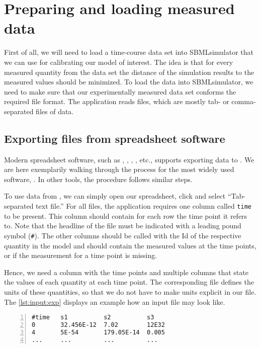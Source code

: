 \section{Preparing and loading measured data}
\label{ch:prepare}

First of all, we will need to load a time-course data set into SBMLsimulator that we can use for calibrating our model of interest.
The idea is that for every measured quantity from the data set the distance of the simulation results to the measured values should be minimized.
To load the data into SBMLsimulator, we need to make sure that our experimentally measured data set conforms the required file format.
The application reads \CSV files, which are mostly tab- or comma-separated files of data.

\subsection{Exporting \CSV files from spreadsheet software}
\label{sec:CSVformat}

Modern spreadsheet software, such as \Excel, \GoogleTables, \LibreCalc, \AppleNumbers, etc., supports exporting data to \CSV.
We are here exemplarily walking through the process for the most widely used software, \Excel.
In other tools, the procedure follows similar steps.

To use data from \Excel, we can simply open our \Excel spreadsheet, click  and select ``Tab-separated text file.''
For all files, the application requires one column called \texttt{time} to be present.
This column should contain for each row the time point it refers to.
Note that the headline of the file must be indicated with a leading pound symbol (\texttt{\#}).
The other columns should be called with the \ac{Id} of the respective quantity in the model and should contain the measured values at the time points, or \NaN if the measurement for a time point is missing. 

Hence, we need a column with the time points and multiple columns that state the values
of each quantity at each time point.
The corresponding \SBML file defines the units of these quantities, so that we do not have to make units explicit in our \CSV file.
The \cref{lst:input:exp} displays an example how an input file may look like.
\begin{lstlisting}[caption={Input file example for experimental data},label={lst:input:exp},numbers=left,captionpos=t,float=t]
#time   s1          s2          s3
0       32.456E-12  7.02        12E32
4       5E-54       179.05E-14  0.005
...     ...         ...         ...
\end{lstlisting}

